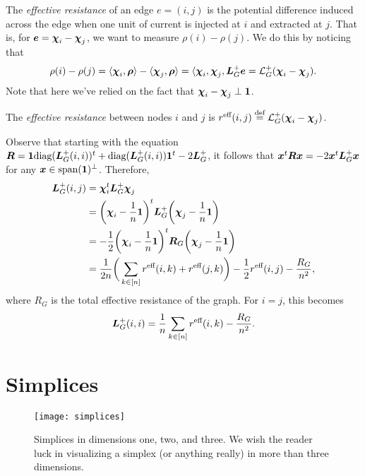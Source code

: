 The \emph{effective resistance} of an edge $e=(i,j)$ is the potential difference induced across the edge when one unit of current is injected at $i$ and extracted at $j$. That is, for $\vb*{e}=\boldsymbol{\chi}_i-\boldsymbol{\chi}_j$, we want to measure $\rho(i)-\rho(j)$. We do this by noticing that 
\[\rho(i)-\rho(j) = \langle \boldsymbol{\chi}_i,\vb*{\rho}\rangle - \langle \boldsymbol{\chi}_j,\vb*{\rho}\rangle = \langle \boldsymbol{\chi}_i,\boldsymbol{\chi}_j,\vb*{L}_G^+\vb*{e}=\mathcal{L}_G^+(\boldsymbol{\chi}_i-\boldsymbol{\chi}_j).\]
Note that here we've relied on the fact that $\boldsymbol{\chi}_i-\boldsymbol{\chi}_j\perp \vb{1}$. 


\begin{definition}
	The \emph{effective resistance} between nodes $i$ and $j$ is $r^{\text{eff}}(i,j) \overset{\text{def}}{=} \mathcal{L}_G^+(\boldsymbol{\chi}_i-\boldsymbol{\chi}_j)$.  
\end{definition}

 Observe that starting with the equation $\vb*{R}=\vb{1}\text{diag}(\vb*{L}_G^+(i,i))^t + \text{diag}(\vb*{L}_G^+(i,i))\vb{1}^t - 2\vb*{L}_G^+$,  it follows that $\vb*{x}^t \vb*{R}\vb*{x} = -2\vb*{x}^t \vb*{L}_G^+\vb*{x}$ for any $\vb*{x}\in\textnormal{span}(\vb{1})^\perp$. Therefore, 
\begin{align}
\vb*{L}_G^+(i,j)&=\boldsymbol{\chi}_i^t \vb*{L}_G^+\boldsymbol{\chi}_j \notag \\
&= \bigg(\boldsymbol{\chi}_i-\frac{1}{n}\vb{1}\bigg)^t \vb*{L}_G^+\bigg(\boldsymbol{\chi}_j-\frac{1}{n}\vb{1}\bigg) \notag \\
&= -\frac{1}{2}\bigg(\boldsymbol{\chi}_i-\frac{1}{n}\vb{1}\bigg)^t \vb*{R}_G\bigg(\boldsymbol{\chi}_j-\frac{1}{n}\vb{1}\bigg) \notag \\
&= \frac{1}{2n}\bigg(\sum_{k\in[n]}r^{\text{eff}}(i,k)+r^{\text{eff}}(j,k)\bigg) - \frac{1}{2}r^{\text{eff}}(i,j) -\frac{R_G}{n^2}, \label{eq:L^+(i,j)}
\end{align}
where $R_G$ is the total effective resistance of the graph. 
For $i=j$, this becomes 
\begin{align}
\vb*{L}_G^+(i,i) = \frac{1}{n} \sum_{k\in[n]}r^{\text{eff}}(i,k) - \frac{R_G}{n^2}.\label{eq:L^+(i,i)}
\end{align}




\section{Simplices}
\label{sec:background_simplices}

\begin{figure}
	\centering
	\texttt{[image: simplices]}
	\caption{Simplices in dimensions one, two, and three. We wish the reader luck in visualizing a simplex (or anything really) in more than three dimensions.}
\end{figure}

